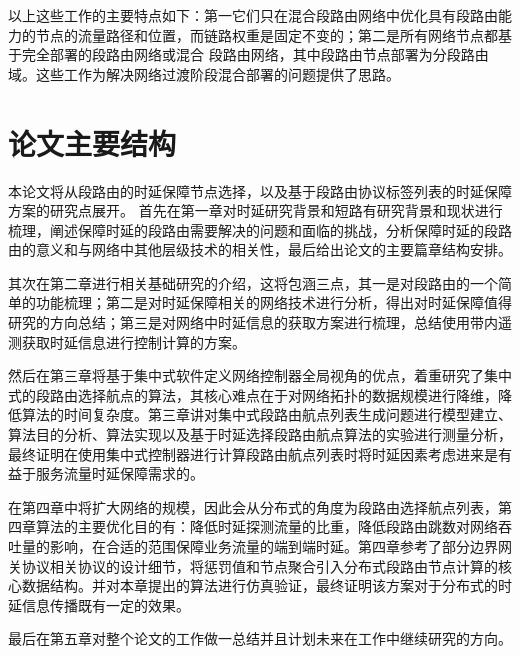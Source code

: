 以上这些工作的主要特点如下：第一它们只在混合段路由网络中优化具有段路由能力的节点的流量路径和位置，而链路权重是固定不变的；第二是所有网络节点都基于完全部署的段路由网络或混合 段路由网络，其中段路由节点部署为分段路由域。这些工作为解决网络过渡阶段混合部署的问题提供了思路。

\section{论文主要结构}

本论文将从段路由的时延保障节点选择，以及基于段路由协议标签列表的时延保障方案的研究点展开。
首先在第一章对时延研究背景和短路有研究背景和现状进行梳理，阐述保障时延的段路由需要解决的问题和面临的挑战，分析保障时延的段路由的意义和与网络中其他层级技术的相关性，最后给出论文的主要篇章结构安排。

其次在第二章进行相关基础研究的介绍，这将包涵三点，其一是对段路由的一个简单的功能梳理；第二是对时延保障相关的网络技术进行分析，得出对时延保障值得研究的方向总结；第三是对网络中时延信息的获取方案进行梳理，总结使用带内遥测获取时延信息进行控制计算的方案。

然后在第三章将基于集中式软件定义网络控制器全局视角的优点，着重研究了集中式的段路由选择航点的算法，其核心难点在于对网络拓扑的数据规模进行降维，降低算法的时间复杂度。第三章讲对集中式段路由航点列表生成问题进行模型建立、算法目的分析、算法实现以及基于时延选择段路由航点算法的实验进行测量分析，最终证明在使用集中式控制器进行计算段路由航点列表时将时延因素考虑进来是有益于服务流量时延保障需求的。

在第四章中将扩大网络的规模，因此会从分布式的角度为段路由选择航点列表，第四章算法的主要优化目的有：降低时延探测流量的比重，降低段路由跳数对网络吞吐量的影响，在合适的范围保障业务流量的端到端时延。第四章参考了部分边界网关协议相关协议的设计细节，将惩罚值和节点聚合引入分布式段路由节点计算的核心数据结构。并对本章提出的算法进行仿真验证，最终证明该方案对于分布式的时延信息传播既有一定的效果。

最后在第五章对整个论文的工作做一总结并且计划未来在工作中继续研究的方向。

\ifx\usechapbib\empty
\nocite{BSTcontrol}
\setcounter{NAT@ctr}{0}


\fi
